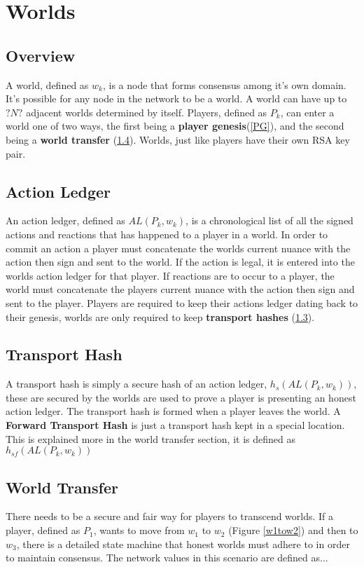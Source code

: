 \documentclass[runningheads,a4paper]{llncs}
\begin{document}
\section{Worlds}
\subsection{Overview}
A world, defined as $w_k$, is a node that forms consensus among it's own domain. It's possible for any node in the network to be a world. A world can have up to $?N?$ adjacent worlds determined by itself. Players, defined as $P_k$, can enter a world one of two ways, the first being a \textbf{player genesis}(\ref{PG}), and the second being a \textbf{world transfer} (\ref{WT}). Worlds, just like players have their own RSA key pair. 


\subsection{Action Ledger}
\label{AL}
An action ledger, defined as $AL(P_{k}, w_k)$, is a chronological list of all the signed actions and reactions that has happened to a player in a world. In order to commit an action a player must concatenate the worlds current nuance with the action then sign and sent to the world. If the action is legal, it is entered into the worlds action ledger for that player. If reactions are to occur to a player, the world must concatenate the players current nuance with the action then sign and sent to the player. Players are required to keep their actions ledger dating back to their genesis, worlds are only required to keep \textbf{transport hashes} (\ref{TH}).

\subsection{Transport Hash}
\label{TH}
A transport hash is simply a secure hash of an action ledger, $h_s(AL(P_{k}, w_k))$, these are secured by the worlds are used to prove a player is presenting an honest action ledger. The transport hash is formed when a player leaves the world. A \textbf{Forward Transport Hash} is just a transport hash kept in a special location. This is explained more in the world transfer section, it is defined as  $h_{sf}(AL(P_{k}, w_k))$

\subsection{World Transfer} 
\label{WT}
There needs to be a secure and fair way for players to transcend worlds. If a player, defined as $P_1$, wants to move from $w_1$ to $w_2$ (Figure \ref{w1tow2}) and then to $w_3$, there is a detailed state machine that honest worlds must adhere to in order to maintain consensus. The network values in this scenario are defined as...
\end{document}
